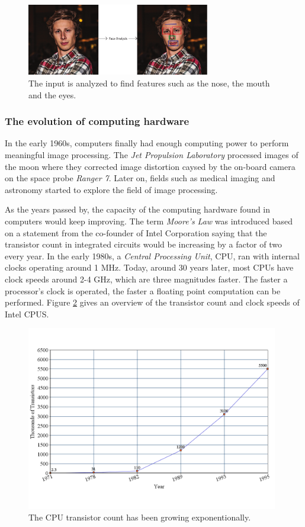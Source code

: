 \begin{figure}[ht!]
\centering
\includegraphics[width=80mm]{img/feature.pdf}
\caption{The input is analyzed to find features such as the nose, the mouth and the eyes.}
\label{feature}
\end{figure}

\subsubsection{The evolution of computing hardware}

In the early 1960s, computers finally had enough computing power to perform meaningful image processing. The \emph{Jet Propulsion Laboratory} processed images of the moon where they corrected image distortion caysed by the on-board camera on the space probe \emph{Ranger 7}\cite{ipbook}. Later on, fields such as medical imaging and astronomy started to explore the field of image processing. 
\newline

As the years passed by, the capacity of the computing hardware found in computers would keep improving. The term \emph{Moore's Law}\cite{mooreslaw} was introduced based on a statement from the co-founder of Intel Corporation saying that the transistor count in integrated circuits would be increasing by a factor of two every year. In the early 1980s, a \emph{Central Processing Unit}, CPU, ran with internal clocks operating around 1 MHz. Today, around 30 years later, most CPUs have clock speeds around 2-4 GHz, which are three magnitudes faster. The faster a processor's clock is operated, the faster a floating point computation can be performed. Figure \ref{intelcpu} gives an overview of the transistor count and clock speeds of Intel CPUS\cite{mooreslawdata}.
\newline
\begin{figure}[ht!]
\centering
\includegraphics[width=110mm]{img/cpu.png}
\caption{The CPU transistor count has been growing exponentionally.}
\label{intelcpu}
\end{figure}

